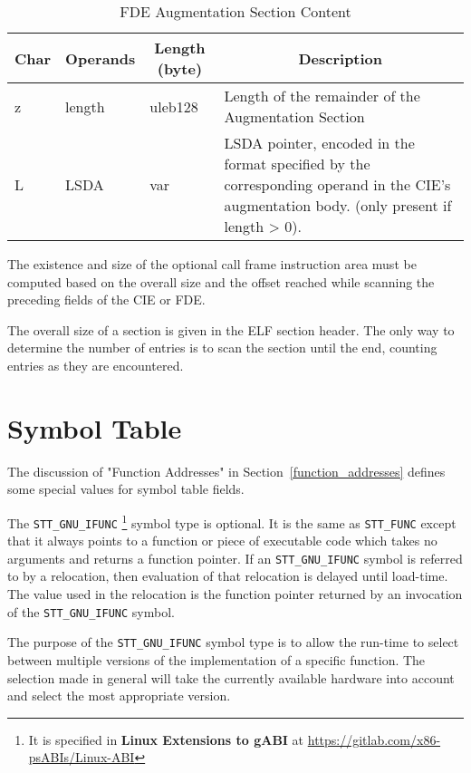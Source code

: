 \begin{table}[H]
\Hrule
\caption{FDE Augmentation Section Content}
\label{format-fdeaug}
\begin{center}
\begin{tabular}{l|p{5em}|l|p{15em}}
  \multicolumn{1}{c}{Char}
         & \multicolumn{1}{c}{Operands}
         & \multicolumn{1}{c}{Length (byte)}
         & \multicolumn{1}{c}{Description} \\ \hline
  z & length & uleb128 & Length of the remainder of the
                                        Augmentation Section \\
  L & LSDA & var & LSDA pointer, encoded in the
                   format specified by the
                   corresponding operand in the CIE's
                   augmentation body. (only present if length > 0). \\
\hline
    \end{tabular}
  \end{center}
\Hrule
\end{table}
The existence and size of the optional call frame instruction area must
be computed
based on the overall size and the offset reached while scanning the
preceding fields of the CIE or FDE.

The overall size of a  section is given in the ELF section
header.  The only way to determine the number of entries is to scan
the section until the end, counting entries as they are encountered.

\section{Symbol Table}

The discussion of "Function Addresses" in Section~\ref{function_addresses}
defines some special values for symbol table fields.

The \texttt{STT_GNU_IFUNC}
\footnote{It is specified in {\bf Linux Extensions to gABI}
at \url{https://gitlab.com/x86-psABIs/Linux-ABI}}
symbol type is optional. It is the same as
\texttt{STT_FUNC} except that it always points to a function or piece of
executable code which takes no arguments and returns a function pointer.
If an \texttt{STT_GNU_IFUNC} symbol is referred to by a relocation, then
evaluation of that relocation is delayed until load-time.  The value
used in the relocation is the function pointer returned by an invocation
of the \texttt{STT_GNU_IFUNC} symbol.
 
The purpose of the \texttt{STT_GNU_IFUNC} symbol type is to allow the
run-time to select between multiple versions of the implementation of
a specific function.  The selection made in general will take the
currently available hardware into account and select the most
appropriate version.

